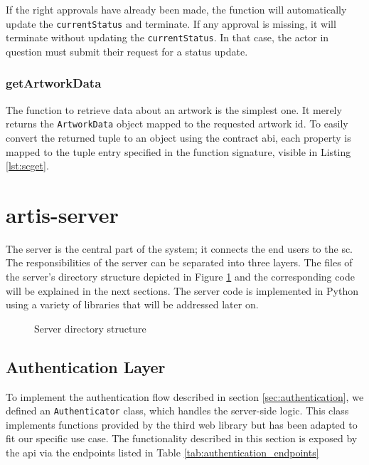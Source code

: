 If the right approvals have already been made, the function will automatically update the \texttt{currentStatus} and terminate. If any approval is missing, it will terminate without updating the \texttt{currentStatus}. In that case, the actor in question must submit their request for a status update.

\subsubsection{getArtworkData}
The function to retrieve data about an artwork is the simplest one. It merely returns the \texttt{ArtworkData} object mapped to the requested artwork \gls{id}. To easily convert the returned tuple to an object using the contract \gls{abi}, each property is mapped to the tuple entry specified in the function signature, visible in Listing \ref{lst:scget}.



\clearpage
\section{artis-server}
The server is the central part of the system; it connects the end users to the \gls{sc}. The responsibilities of the server can be separated into three layers. The files of the server's directory structure depicted in Figure \ref{fig:server_directory_structure} and the corresponding code will be explained in the next sections. The server code is implemented in Python using a variety of libraries that will be addressed later on.

\begin{figure}
    \centering
        
    \caption{Server directory structure}
    \label{fig:server_directory_structure}
\end{figure}

\subsection{Authentication Layer}
\label{sec:authentication_layer}
To implement the authentication flow described in section \ref{sec:authentication}, we defined an \texttt{Authenticator} class, which handles the server-side logic. This class implements functions provided by the third web library \cite{thirdweb} but has been adapted to fit our specific use case. The functionality described in this section is exposed by the \gls{api} via the endpoints listed in Table \ref{tab:authentication_endpoints}

